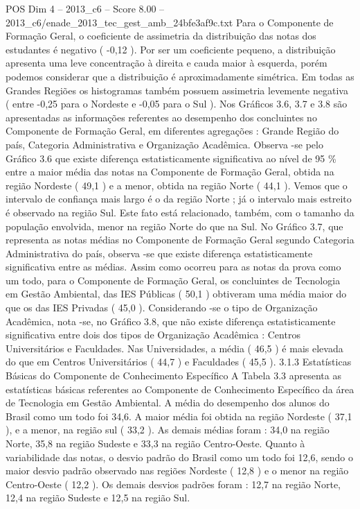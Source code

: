\begin{textsample}{POS Dim 4 – 2013\_c6 – Score 8.00 – 2013\_c6/enade\_2013\_tec\_gest\_amb\_24bfe3af9c.txt}
Para o Componente de Formação Geral, o coeficiente de assimetria da distribuição das notas dos estudantes é negativo ( -0,12 ).
Por ser um coeficiente pequeno, a distribuição apresenta uma leve concentração à direita e cauda maior à esquerda, porém podemos considerar que a distribuição é aproximadamente simétrica.
Em todas as Grandes Regiões os histogramas também possuem assimetria levemente negativa ( entre -0,25 para o Nordeste e -0,05 para o Sul ).
Nos Gráficos 3.6, 3.7 e 3.8 são apresentadas as informações referentes ao desempenho dos concluintes no Componente de Formação Geral, em diferentes agregações : Grande Região do país, Categoria Administrativa e Organização Acadêmica.
Observa -se pelo Gráfico 3.6 que existe diferença estatisticamente significativa ao nível de 95 \% entre a maior média das notas na Componente de Formação Geral, obtida na região Nordeste ( 49,1 ) e a menor, obtida na região Norte ( 44,1 ).
Vemos que o intervalo de confiança mais largo é o da região Norte ; já o intervalo mais estreito é observado na região Sul.
Este fato está relacionado, também, com o tamanho da população envolvida, menor na região Norte do que na Sul.
No Gráfico 3.7, que representa as notas médias no Componente de Formação Geral segundo Categoria Administrativa do país, observa -se que existe diferença estatisticamente significativa entre as médias.
Assim como ocorreu para as notas da prova como um todo, para o Componente de Formação Geral, os concluintes de Tecnologia em Gestão Ambiental, das IES Públicas ( 50,1 ) obtiveram uma média maior do que os das IES Privadas ( 45,0 ).
Considerando -se o tipo de Organização Acadêmica, nota -se, no Gráfico 3.8, que não existe diferença estatisticamente significativa entre dois dos tipos de Organização Acadêmica : Centros Universitários e Faculdades.
Nas Universidades, a média ( 46,5 ) é mais elevada do que em Centros Universitários ( 44,7 ) e Faculdades ( 45,5 ). 3.1.3 Estatísticas Básicas do Componente de Conhecimento Específico A Tabela 3.3 apresenta as estatísticas básicas referentes ao Componente de Conhecimento Específico da área de Tecnologia em Gestão Ambiental.
A média do desempenho dos alunos do Brasil como um todo foi 34,6.
A maior média foi obtida na região Nordeste ( 37,1 ), e a menor, na região sul ( 33,2 ).
As demais médias foram : 34,0 na região Norte, 35,8 na região Sudeste e 33,3 na região Centro-Oeste.
Quanto à variabilidade das notas, o desvio padrão do Brasil como um todo foi 12,6, sendo o maior desvio padrão observado nas regiões Nordeste ( 12,8 ) e o menor na região Centro-Oeste ( 12,2 ).
Os demais desvios padrões foram : 12,7 na região Norte, 12,4 na região Sudeste e 12,5 na região Sul.

\end{textsample}
